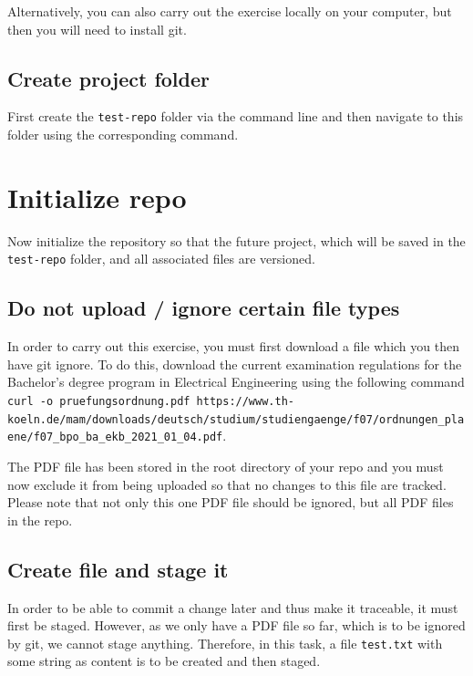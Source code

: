 \documentclass[
  letterpaper,
  DIV=11,
  numbers=noendperiod]{scrreprt}
\begin{document}
Alternatively, you can also carry out the exercise locally on your
computer, but then you will need to install git.

\subsection{Create project folder}\label{create-project-folder}

First create the \texttt{test-repo} folder via the command line and then
navigate to this folder using the corresponding command.

\section{Initialize repo}\label{initialize-repo}

Now initialize the repository so that the future project, which will be
saved in the \texttt{test-repo} folder, and all associated files are
versioned.

\subsection{Do not upload / ignore certain file
types}\label{do-not-upload-ignore-certain-file-types}

In order to carry out this exercise, you must first download a file
which you then have git ignore. To do this, download the current
examination regulations for the Bachelor's degree program in Electrical
Engineering using the following command
\texttt{curl\ -o\ pruefungsordnung.pdf\ https://www.th-koeln.de/mam/downloads/deutsch/studium/studiengaenge/f07/ordnungen\_plaene/f07\_bpo\_ba\_ekb\_2021\_01\_04.pdf}.

The PDF file has been stored in the root directory of your repo and you
must now exclude it from being uploaded so that no changes to this file
are tracked. Please note that not only this one PDF file should be
ignored, but all PDF files in the repo.

\subsection{Create file and stage it}\label{create-file-and-stage-it}

In order to be able to commit a change later and thus make it traceable,
it must first be staged. However, as we only have a PDF file so far,
which is to be ignored by git, we cannot stage anything. Therefore, in
this task, a file \texttt{test.txt} with some string as content is to be
created and then staged.
\end{document}

